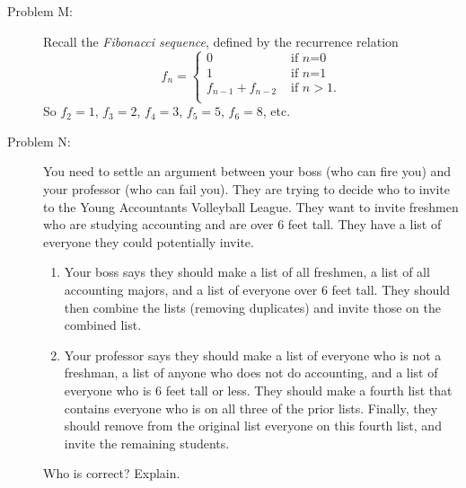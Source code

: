 \begin{description}
\item[Problem M:]
Recall the {\em Fibonacci sequence}, defined by the recurrence relation
$$f_n=\left\{
\begin{array}{ll}
0&\mbox{ if $n$=0}\\
1&\mbox{ if $n$=1}\\
f_{n-1}+f_{n-2}&\mbox{ if }n>1.\\
\end{array}
\right.
$$
So $f_2=1$, $f_3=2$, $f_4=3$, $f_5=5$, $f_6=8$, etc.




\item[Problem N:]
You need to settle an argument between your boss (who can fire you) and your professor (who can fail you).  
They are trying to decide who to invite to the Young Accountants Volleyball League.  
They want to invite freshmen who are studying accounting and are over 6 feet tall.  
They have a list of everyone they could potentially invite.
\begin{enumerate}
\item
Your boss says they should make a list of all freshmen, 
a list of all accounting majors, and a list of everyone over 6 feet tall.  
They should then combine the lists (removing duplicates) and invite those on the combined list. 
\item
Your professor says they should make a list of everyone who is not a freshman, 
a list of anyone who does not do accounting, and a list of everyone who is 6 feet tall or less. 
They should make a fourth list that contains everyone who is on all three of the prior lists.  
Finally, they should remove from the original list everyone on this fourth list, 
and invite the remaining students.
\end{enumerate}
Who is correct? Explain.


\end{description}
